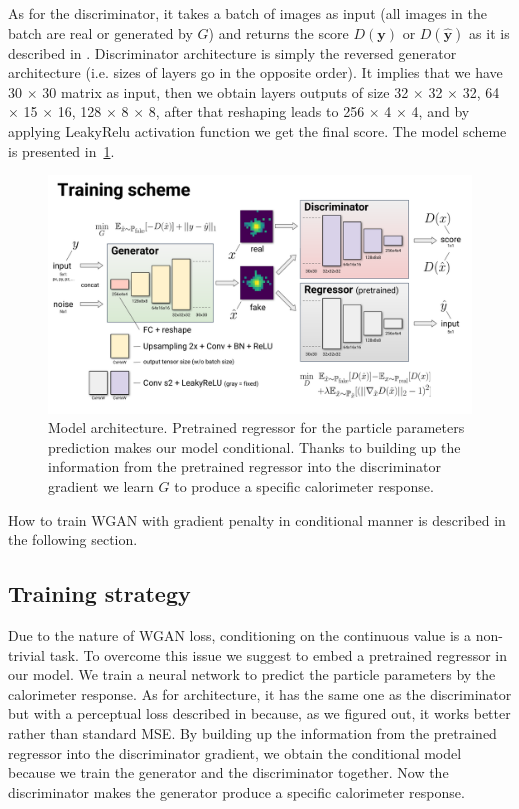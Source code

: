 \documentclass{webofc}
\begin{document}
As for the discriminator, it takes a batch of images as input (all images in the batch are real or generated by $G$) and returns the score $D(\textbf{y})$ or $D(\hat{\textbf{y}})$ as it is described in \cite{arjovsky2017wasserstein}. Discriminator architecture is simply the reversed generator architecture (i.e. sizes of layers go in the opposite order). It implies that we have 30 $\times$ 30 matrix as input, then we obtain layers outputs of size 32 $\times$ 32 $\times$ 32, 64 $\times$ 15 $\times$ 16, 128 $\times$ 8 $\times$  8, after that reshaping leads to 256 $\times$ 4 $\times$ 4, and by applying LeakyRelu activation function we get the final score. The model scheme is presented in~\cref{fig:model}.

\begin{figure}
\centering
\includegraphics[width=1\textwidth]{figures/model_architecture.pdf}
\caption{Model architecture. Pretrained regressor for the particle parameters prediction makes our model conditional. Thanks to building up the information from the pretrained regressor into the discriminator gradient we learn $G$ to produce a specific calorimeter response.}\label{fig:model}
\end{figure}

How to train WGAN with gradient penalty in conditional manner is described in the following section.

\subsection{Training strategy} \label{sec:training_strategy}
Due to the nature of WGAN loss, conditioning on the continuous value is a non-trivial task. To overcome this issue we suggest to embed a pretrained regressor in our model. We train a neural network to predict the particle parameters by the calorimeter response. As for architecture, it has the same one as the discriminator but with a perceptual loss described in \cite{johnson2016perceptual} because, as we figured out, it works better rather than standard MSE. By building up the information from the pretrained regressor into the discriminator gradient, we obtain the conditional model because we train the generator and the discriminator together. Now the discriminator makes the generator produce a specific calorimeter response.
\end{document}
